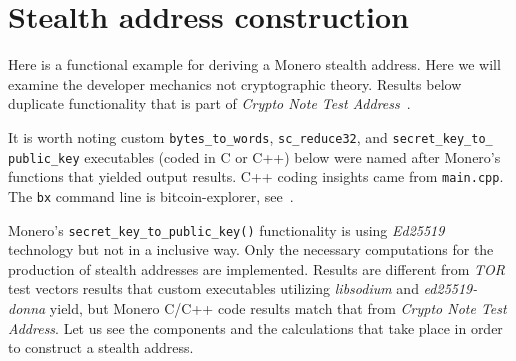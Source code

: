 \chapter{Stealth address construction} \label{sec:construction}
Here is a functional example for deriving a Monero stealth address. Here we will examine the developer mechanics not cryptographic theory. Results below duplicate functionality that is part of \emph{Crypto Note Test Address}~\cite{teststealth}.

It is worth noting custom \verb|bytes_to_words|, \verb|sc_reduce32|, and \verb|secret_key_to_| \verb|public_key| executables (coded in C or C++) below were named after Monero's functions that yielded output results. C++ coding insights came from \verb|main.cpp|. The \verb|bx| command line is bitcoin-explorer, see~\cite{bx}.

Monero's \verb|secret_key_to_public_key()| functionality is using \emph{Ed25519} technology but not in a inclusive way. Only the necessary computations for the production of stealth addresses are implemented. Results are different from \emph{TOR} test vectors results that custom executables utilizing \emph{libsodium} and \emph{ed25519-donna} yield, but Monero C/C++ code results match that from \emph{Crypto Note Test Address}. Let us see the components and the calculations that take place in order to construct a stealth address.


